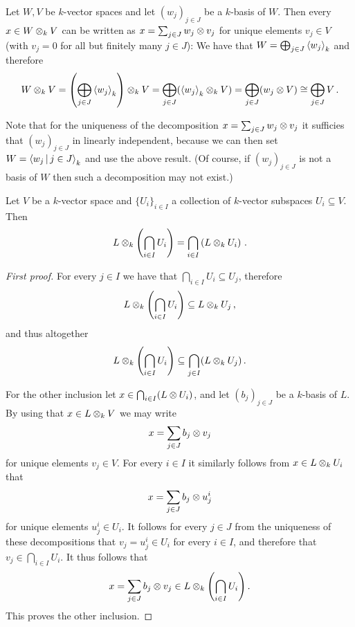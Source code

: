 \begin{recall}
  \label{recall: unique representation in tensor product}
  Let $W, V$ be $k$-vector spaces and let $(w_j)_{j \in J}$ be a $k$-basis of $W$.
  Then every $x \in W \mathbin{\otimes}_k V$ can be written as $x = \sum_{j \in J} w_j \mathbin{\otimes} v_j$ for unique elements $v_j \in V$ (with $v_j = 0$ for all but finitely many $j \in J$):
  We have that $W = \bigoplus_{j \in J} \left\langle w_j \right\rangle_k$ and therefore
  \[
          W \mathbin{\otimes}_k V
    =     \left( \bigoplus_{j \in J} \left\langle w_j \right\rangle_k \right) \mathbin{\otimes}_k V
    =     \bigoplus_{j \in J} ( \left\langle w_j \right\rangle_k \mathbin{\otimes}_k V )
    =     \bigoplus_{j \in J} (w_j \mathbin{\otimes} V)
    \cong \bigoplus_{j \in J} V \,.
  \]
  
  Note that for the uniqueness of the decomposition $x = \sum_{j \in J} w_j \mathbin{\otimes} v_j$ it sufficies that $(w_j)_{j \in J}$ in linearly independent, because we can then set $W = \gen{w_j \suchthat j \in J}_k$ and use the above result.
  (Of course, if $(w_j)_{j \in J}$ is not a basis of $W$ then such a decomposition may not exist.)
\end{recall}


\begin{corollary}
  Let $V$ be a $k$-vector space and $\{U_i\}_{i \in I}$ a collection of $k$-vector subspaces $U_i \subseteq V$.
  Then
  \[
      L \mathbin{\otimes}_k \left( \bigcap_{i \in I} U_i \right)
    = \bigcap_{i \in I} \left( L \mathbin{\otimes}_k U_i \right) \,.
  \]
\end{corollary}


\begin{proof}[First proof]
  For every $j \in I$ we have that $\bigcap_{i \in I} U_i \subseteq U_j$, therefore
  \[
              L \mathbin{\otimes}_k \left( \bigcap_{i \in I} U_i \right)
    \subseteq L \mathbin{\otimes}_k U_j \,,
  \]
  and thus altogether
  \[
              L \mathbin{\otimes}_k \left( \bigcap_{i \in I} U_i \right)
    \subseteq \bigcap_{j \in I} (L \mathbin{\otimes}_k U_j) \,.
  \]
  
  For the other inclusion let $x \in \bigcap_{i \in I} (L \mathbin{\otimes} U_i)$, and let $(b_j)_{j \in J}$ be a $k$-basis of $L$.
  By using that $x \in L \mathbin{\otimes}_k V$ we may write
  \[
      x
    = \sum_{j \in J} b_j \mathbin{\otimes} v_j
  \]
  for unique elements $v_j \in V$.
  For every $i \in I$ it similarly follows from $x \in L \mathbin{\otimes}_k U_i$ that
  \[
      x
    = \sum_{j \in J} b_j \mathbin{\otimes} u^i_j
  \]
  for unique elements $u^i_j \in U_i$.
  It follows for every $j \in J$ from the uniqueness of these decompositions that $v_j = u^i_j \in U_i$ for every $i \in I$, and therefore that $v_j \in \bigcap_{i \in I} U_i$.
  It thus follows that
  \[
        x
    =   \sum_{j \in J} b_j \mathbin{\otimes} v_j
    \in L \mathbin{\otimes}_k \left( \bigcap_{i \in I} U_i \right).
  \]
  This proves the other inclusion.
\end{proof}






